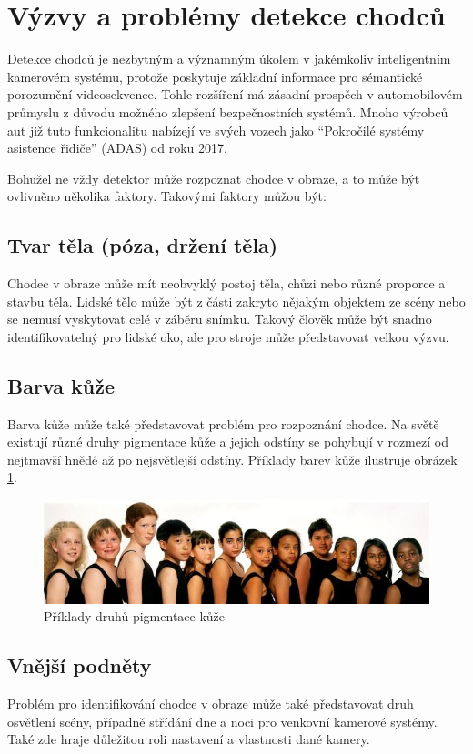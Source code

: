 \section{Výzvy a problémy detekce chodců}
Detekce chodců je nezbytným a významným úkolem v jakémkoliv inteligentním kamerovém systému, protože poskytuje základní informace pro sémantické porozumění videosekvence. Tohle rozšíření má zásadní prospěch v automobilovém průmyslu z důvodu možného zlepšení bezpečnostních systémů. Mnoho výrobců aut již tuto funkcionalitu nabízejí ve svých vozech jako ``Pokročilé systémy asistence řidiče'' (ADAS) od roku 2017.

Bohužel ne vždy detektor může rozpoznat chodce v obraze, a to může být ovlivněno několika faktory. Takovými faktory můžou být:

\subsection{Tvar těla (póza, držení těla)}
Chodec v obraze může mít neobvyklý postoj těla, chůzi nebo různé proporce a stavbu těla. Lidské tělo může být z části zakryto nějakým objektem ze scény nebo se nemusí vyskytovat celé v záběru snímku. Takový člověk může být snadno identifikovatelný pro lidské oko, ale pro stroje může představovat velkou výzvu. 

\subsection{Barva kůže}
Barva kůže může také představovat problém pro rozpoznání chodce. Na světě existují různé druhy pigmentace kůže a jejich odstíny se pohybují v rozmezí od nejtmavší hnědé až po nejsvětlejší odstíny. Příklady barev kůže ilustruje obrázek \ref{colorskin}.

\begin{figure}[H]
\centering
\includegraphics[width=15cm]{figures/colorskin}
\caption{Příklady druhů pigmentace kůže\cite{skincolor:obr}}
\label{colorskin}
\end{figure}

\subsection{Vnější podněty}
Problém pro identifikování chodce v obraze může také představovat druh osvětlení scény, případně střídání dne a noci pro venkovní kamerové systémy. Také zde hraje důležitou roli nastavení a vlastnosti dané kamery. 

